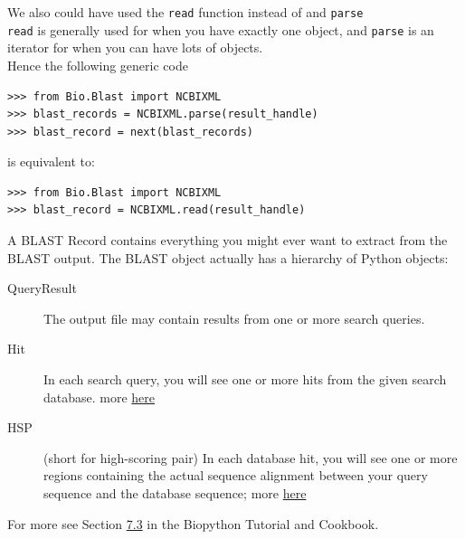 \documentclass[xcolor=svgnames, handout]{beamer}
\newcommand{\nl}{\\[1em]}
\begin{document}
\begin{frame}[fragile]
We also could have used the {\tt read} function instead of  and {\tt parse}\nl
{\tt read} is generally used for when you have exactly one object, and {\tt parse} is an iterator for when you can have lots of objects.  \nl

Hence the following generic code
\begin{Verbatim}[xleftmargin=.5in]
>>> from Bio.Blast import NCBIXML
>>> blast_records = NCBIXML.parse(result_handle)
>>> blast_record = next(blast_records)
\end{Verbatim}
is equivalent to:
\begin{Verbatim}[xleftmargin=.5in]
>>> from Bio.Blast import NCBIXML
>>> blast_record = NCBIXML.read(result_handle)
\end{Verbatim}
\end{frame}



\begin{frame}
A BLAST Record contains everything you might ever want to extract from the BLAST output. The BLAST object actually has a hierarchy of Python objects:
\begin{description}
\item[QueryResult] The output file may contain results from one or more search queries.
\item[Hit] In each search query, you will see one or more hits from the given search database.  more \href{http://biopython.org/DIST/docs/api/Bio.Blast.Record.Alignment-class.html}{here}
\item[HSP] (short for high-scoring pair) In each database hit, you will see one or more regions containing the actual sequence alignment between your query sequence and the database sequence; more \href{http://biopython.org/DIST/docs/api/Bio.Blast.Record.HSP-class.html}{here}
\end{description}
For more see Section \href{http://biopython.org/DIST/docs/tutorial/Tutorial.html\#htoc102}{7.3} in the Biopython Tutorial and Cookbook.


\end{frame}
\end{document}
